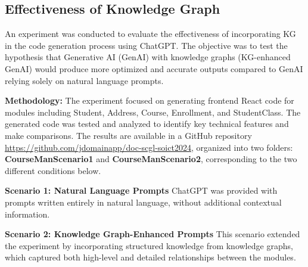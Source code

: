 \documentclass[runningheads]{llncs}
\begin{document}
\subsection{Effectiveness of Knowledge Graph}
An experiment was conducted to evaluate the effectiveness of incorporating KG in the code generation process using ChatGPT. The objective was to test the hypothesis that Generative AI (GenAI) with knowledge graphs (KG-enhanced GenAI) would produce more optimized and accurate outputs compared to GenAI relying solely on natural language prompts. 

\textbf{Methodology:} The experiment focused on generating frontend React code for modules including Student, Address, Course, Enrollment, and StudentClass. The generated code was tested and analyzed to identify key technical features and make comparisons. The results are available in a GitHub repository \url{https://github.com/jdomainapp/doc-scgl-soict2024}, organized into two folders: \textbf{CourseManScenario1} and \textbf{CourseManScenario2}, corresponding to the two different conditions below.

\textbf{Scenario 1: Natural Language Prompts}
ChatGPT was provided with prompts written entirely in natural language, without additional contextual information. 

\textbf{Scenario 2: Knowledge Graph-Enhanced Prompts}
This scenario extended the experiment by incorporating structured knowledge from knowledge graphs, which captured both high-level and detailed relationships between the modules.
\end{document}
